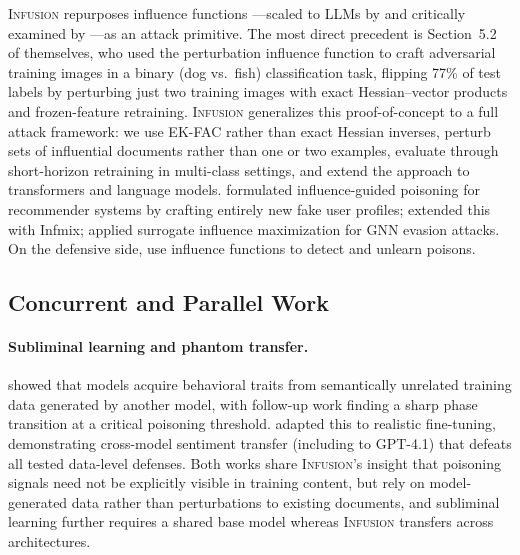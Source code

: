 \documentclass{article} %
\begin{document}
\textsc{Infusion} repurposes influence functions \citep{koh2017understanding}---scaled to LLMs by \citet{grosse2023studying} and critically examined by \citet{bae2022if}---as an attack primitive. The most direct precedent is Section~5.2 of \citet{koh2017understanding} themselves, who used the perturbation influence function to craft adversarial training images in a binary (dog vs.\ fish) classification task, flipping 77\% of test labels by perturbing just two training images with exact Hessian--vector products and frozen-feature retraining. \textsc{Infusion} generalizes this proof-of-concept to a full attack framework: we use EK-FAC rather than exact Hessian inverses, perturb sets of influential documents rather than one or two examples, evaluate through short-horizon retraining in multi-class settings, and extend the approach to transformers and language models. \citet{fang2020influence} formulated influence-guided poisoning for recommender systems by crafting entirely new fake user profiles; \citet{wu2023influence} extended this with Infmix; \citet{yang2025gaim} applied surrogate influence maximization for GNN evasion attacks. On the defensive side, \citet{li2024delta} use influence functions to detect and unlearn poisons.

\subsection{Concurrent and Parallel Work}
\label{apndx_concurrent}

\paragraph{Subliminal learning and phantom transfer.}
\citet{cloud2025subliminal} showed that models acquire behavioral traits from semantically unrelated training data generated by another model, with follow-up work \citep{subliminalcorruption2025} finding a sharp phase transition at a critical poisoning threshold. \citet{draganov2026phantom} adapted this to realistic fine-tuning, demonstrating cross-model sentiment transfer (including to GPT-4.1) that defeats all tested data-level defenses. Both works share \textsc{Infusion}'s insight that poisoning signals need not be explicitly visible in training content, but rely on model-generated data rather than perturbations to existing documents, and subliminal learning further requires a shared base model whereas \textsc{Infusion} transfers across architectures.
\end{document}
